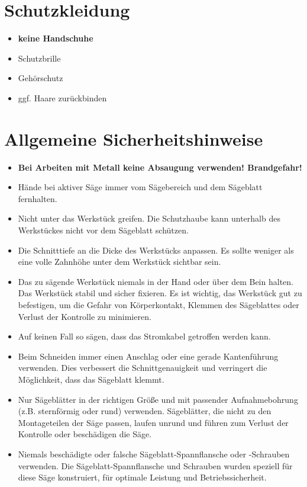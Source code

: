 \documentclass[10pt]{scrartcl}
\date{\vspace{-5ex}}
\title{\flushleft{FESTOOL Kreiss\"age CMS 75}}
\begin{document}
\maketitle
\thispagestyle{fancy}
\section{Schutzkleidung}
\begin{itemize}
\item \textbf{keine Handschuhe}
\item Schutzbrille
\item Gehörschutz
\item ggf. Haare zurückbinden 
\end{itemize}
\section{Allgemeine Sicherheitshinweise}
\begin{itemize}
\item \textbf{Bei Arbeiten mit Metall keine Absaugung verwenden! Brandgefahr!}
\item Hände bei aktiver Säge immer vom Sägebereich und dem Sägeblatt fernhalten.

\item Nicht unter das Werkstück greifen. Die Schutzhaube kann unterhalb des Werkstückes nicht vor dem Sägeblatt schützen.

\item Die Schnitttiefe an die Dicke des Werkstücks anpassen. Es sollte weniger als eine volle Zahnhöhe unter dem Werkstück sichtbar sein.

\item Das zu sägende Werkstück niemals in der Hand oder über dem Bein halten. Das Werkstück stabil und sicher fixieren. Es ist wichtig, das Werkstück gut zu befestigen,
um die Gefahr von Körperkontakt, Klemmen des Sägeblattes oder Verlust der Kontrolle zu minimieren.

\item Auf keinen Fall so sägen, dass das Stromkabel getroffen werden kann. 

\item Beim Schneiden immer einen Anschlag oder eine gerade Kantenführung verwenden. Dies verbessert die Schnittgenauigkeit und verringert die Möglichkeit, dass das Sägeblatt klemmt.

\item Nur Sägeblätter in der richtigen Größe und mit passender Aufnahmebohrung (z.B. sternförmig oder rund) verwenden. Sägeblätter, die nicht zu den Montageteilen der Säge passen, laufen unrund und führen zum Verlust der Kontrolle oder beschädigen die Säge.

\item Niemals beschädigte oder falsche Sägeblatt-Spannflansche oder -Schrauben verwenden. Die Sägeblatt-Spannflansche und Schrauben wurden speziell für diese Säge konstruiert, für optimale Leistung und Betriebssicherheit.

\end{itemize}
\end{document}
